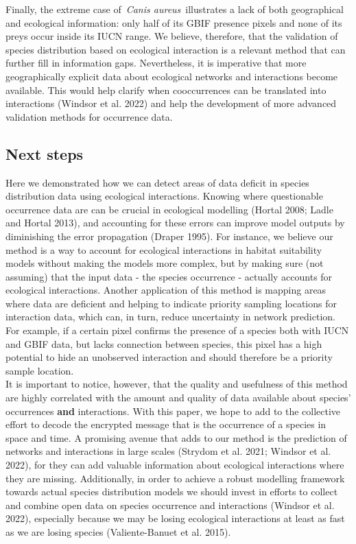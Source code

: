 \documentclass[10pt,oneside]{article}
\begin{document}
Finally, the extreme case of~\emph{Canis aureus}~illustrates a lack of
both geographical and ecological information: only half of its GBIF
presence pixels and none of its preys occur inside its IUCN range. We
believe, therefore, that the validation of species distribution based on
ecological interaction is a relevant method that can further fill in
information gaps. Nevertheless, it is imperative that more
geographically explicit data about ecological networks and interactions
become available. This would help clarify when cooccurrences can be
translated into interactions (Windsor et al. 2022) and help the
development of more advanced validation methods for occurrence data.

\hypertarget{next-steps}{%
\subsection{Next steps}\label{next-steps}}

Here we demonstrated how we can detect areas of data deficit in species
distribution data using ecological interactions. Knowing where
questionable occurrence data are can be crucial in ecological modelling
(Hortal 2008; Ladle and Hortal 2013), and accounting for these errors
can improve model outputs by diminishing the error propagation (Draper
1995). For instance, we believe our method is a way to account for
ecological interactions in habitat suitability models without making the
models more complex, but by making sure (not assuming) that the input
data - the species occurrence - actually accounts for ecological
interactions. Another application of this method is mapping areas where
data are deficient and helping to indicate priority sampling locations
for interaction data, which can, in turn, reduce uncertainty in network
prediction. For example, if a certain pixel confirms the presence of a
species both with IUCN and GBIF data, but lacks connection between
species, this pixel has a high potential to hide an unobserved
interaction and should therefore be a priority sample location.\\
It is important to notice, however, that the quality and usefulness of
this method are highly correlated with the amount and quality of data
available about species' occurrences \textbf{and} interactions. With
this paper, we hope to add to the collective effort to decode the
encrypted message that is the occurrence of a species in space and time.
A promising avenue that adds to our method is the prediction of networks
and interactions in large scales (Strydom et al. 2021; Windsor et al.
2022), for they can add valuable information about ecological
interactions where they are missing. Additionally, in order to achieve a
robust modelling framework towards actual species distribution models we
should invest in efforts to collect and combine open data on species
occurrence and interactions (Windsor et al. 2022), especially because we
may be losing ecological interactions at least as fast as we are losing
species (Valiente-Banuet et al. 2015).
\end{document}
